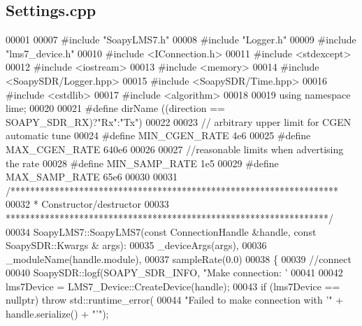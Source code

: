 \subsection{Settings.\+cpp}
\label{Settings_8cpp_source}

\begin{DoxyCode}
00001 
00007 \textcolor{preprocessor}{#include "SoapyLMS7.h"}
00008 \textcolor{preprocessor}{#include "Logger.h"}
00009 \textcolor{preprocessor}{#include "lms7_device.h"}
00010 \textcolor{preprocessor}{#include <IConnection.h>}
00011 \textcolor{preprocessor}{#include <stdexcept>}
00012 \textcolor{preprocessor}{#include <iostream>}
00013 \textcolor{preprocessor}{#include <memory>}
00014 \textcolor{preprocessor}{#include <SoapySDR/Logger.hpp>}
00015 \textcolor{preprocessor}{#include <SoapySDR/Time.hpp>}
00016 \textcolor{preprocessor}{#include <cstdlib>}
00017 \textcolor{preprocessor}{#include <algorithm>}
00018 
00019 \textcolor{keyword}{using namespace }lime;
00020 
00021 \textcolor{preprocessor}{#define dirName ((direction == SOAPY\_SDR\_RX)?"Rx":"Tx")}
00022 
00023 \textcolor{comment}{// arbitrary upper limit for CGEN automatic tune}
00024 \textcolor{preprocessor}{#define MIN\_CGEN\_RATE 4e6}
00025 \textcolor{preprocessor}{#define MAX\_CGEN\_RATE 640e6}
00026 
00027 \textcolor{comment}{//reasonable limits when advertising the rate}
00028 \textcolor{preprocessor}{#define MIN\_SAMP\_RATE 1e5}
00029 \textcolor{preprocessor}{#define MAX\_SAMP\_RATE 65e6}
00030 
00031 \textcolor{comment}{/*******************************************************************}
00032 \textcolor{comment}{ * Constructor/destructor}
00033 \textcolor{comment}{ ******************************************************************/}
00034 SoapyLMS7::SoapyLMS7(\textcolor{keyword}{const} ConnectionHandle &handle, \textcolor{keyword}{const} SoapySDR::Kwargs &
      args):
00035     \_deviceArgs(args),
00036     \_moduleName(handle.module),
00037     sampleRate(0.0)
00038 \{
00039     \textcolor{comment}{//connect}
00040     SoapySDR::logf(SOAPY\_SDR\_INFO, \textcolor{stringliteral}{"Make connection: '%
00041 
00042     lms7Device = LMS7\_Device::CreateDevice(handle);
00043     \textcolor{keywordflow}{if} (lms7Device == \textcolor{keyword}{nullptr}) \textcolor{keywordflow}{throw} std::runtime\_error(
00044         \textcolor{stringliteral}{"Failed to make connection with '"} + handle.serialize() + \textcolor{stringliteral}{"'"});
}
\end{DoxyCode}
